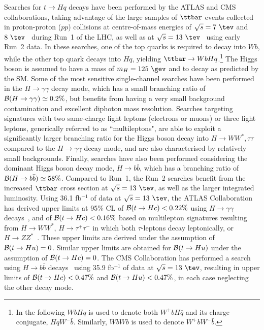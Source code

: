 Searches for $t \to Hq$ decays have been performed by the ATLAS and CMS collaborations, taking advantage of the large samples
of $\ttbar$ events collected in proton-proton ($pp$) collisions at centre-of-mass energies of $\sqrt{s}=7~\tev$ and $8~\tev$~\cite{Aad:2014dya,Aad:2015pja,Khachatryan:2016atv} during Run~1 of the LHC, as well as at $\sqrt{s}=13~\tev$~\cite{Aaboud:2017mfd,Aaboud:2018pob,Sirunyan:2017uae} using early Run~2 data.
In these searches, one of the top quarks is required to decay into $Wb$, while the other top quark decays into $Hq$, yielding $\ttbar \to WbHq$.\footnote{ 
In the following $WbHq$ is used to denote both $W^+b H\bar{q}$ and its charge conjugate, $HqW^- \bar{b}$. Similarly, 
$WbWb$ is used to denote $W^+b W^- \bar{b}$.}  The Higgs boson is assumed to have a mass of $m_H=125~\gev$ and to decay as predicted by
the SM. Some of the most sensitive single-channel searches have been performed in the $H\to\gamma\gamma$ decay mode, which
has a small branching ratio of $\mathcal{B}(H\to \gamma\gamma)\simeq 0.2\%$, but benefits from having a very small background contamination 
and excellent diphoton mass re\-so\-lu\-tion. 
Searches targeting signatures with two same-charge light leptons (electrons or muons) or three light leptons, generically referred to as ``multileptons",
are able to exploit a significantly larger branching ratio for the Higgs 
boson decay into $H \to WW^*, \tau\tau$ compared to the $H\to\gamma\gamma$ decay mode, and are also characterised by relatively small backgrounds.
Finally, searches have also been performed considering the dominant Higgs boson decay mode, $H\to b\bar{b}$, which has a branching ratio 
of $\mathcal{B}(H\to b\bar{b})\simeq 58\%$. Compared to Run~1, the Run~2 searches benefit from the increased $\ttbar$ cross section at $\sqrt{s}=13~\tev$, 
as well as the larger integrated luminosity.
Using 36.1 fb$^{-1}$ of data at $\sqrt{s}=13~\tev$, the ATLAS Collaboration has derived upper limits at 95\% CL of  
$\mathcal{B}(t\to Hc)<0.22\%$ using $H\to \gamma\gamma$ decays~\cite{Aaboud:2017mfd}, and of $\mathcal{B}(t\to Hc)<0.16\%$ based on
multilepton signatures resulting from 
$H \to WW^*$, $H\to \tau^+\tau^-$ in which both $\tau$-leptons decay leptonically, or $H \to ZZ^*$~\cite{Aaboud:2018pob}.
These upper limits are derived under the assumption of $\mathcal{B}(t\to Hu)=0$. Similar upper limits are obtained for $\mathcal{B}(t\to Hu)$ under the
assumption of $\mathcal{B}(t\to Hc)=0$. The CMS Collaboration has performed a search using  
$H\to b\bar{b}$ decays~\cite{Sirunyan:2017uae} using 35.9 fb$^{-1}$ of data at $\sqrt{s}=13~\tev$, resulting 
in upper limits of $\mathcal{B}(t\to Hc)<0.47\%$ and $\mathcal{B}(t\to Hu)<0.47\%$, in each case neglecting the other decay mode.

